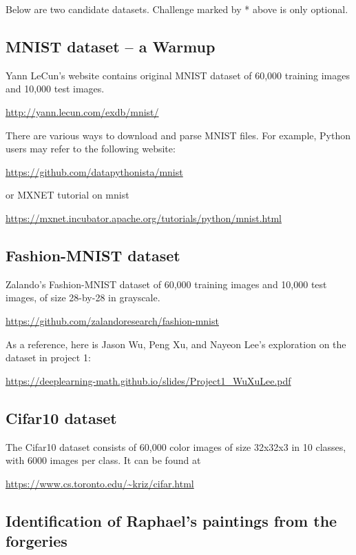 \documentclass[11pt]{article}
\begin{document}
Below are two candidate datasets. Challenge marked by * above is only optional. 

\subsection{MNIST dataset -- a Warmup}

Yann LeCun's website contains original MNIST dataset of 60,000 training images and 10,000 test images. 

\url{http://yann.lecun.com/exdb/mnist/}

There are various ways to download and parse MNIST files. For example, Python users may refer to the following website:

\url{https://github.com/datapythonista/mnist}

or MXNET tutorial on mnist

\url{https://mxnet.incubator.apache.org/tutorials/python/mnist.html}

\subsection{Fashion-MNIST dataset}

Zalando's Fashion-MNIST dataset of 60,000 training images and 10,000 test images, of size 28-by-28 in grayscale. 

\url{https://github.com/zalandoresearch/fashion-mnist}

As a reference, here is Jason Wu, Peng Xu, and Nayeon Lee's exploration on the dataset in project 1:

\url{https://deeplearning-math.github.io/slides/Project1_WuXuLee.pdf}

\subsection{Cifar10 dataset} 

The Cifar10 dataset consists of 60,000 color images of size 32x32x3 in 10 classes, with 6000 images per class. It can be found at 

\url{https://www.cs.toronto.edu/~kriz/cifar.html}


\subsection{Identification of Raphael's paintings from the forgeries}
\end{document}
